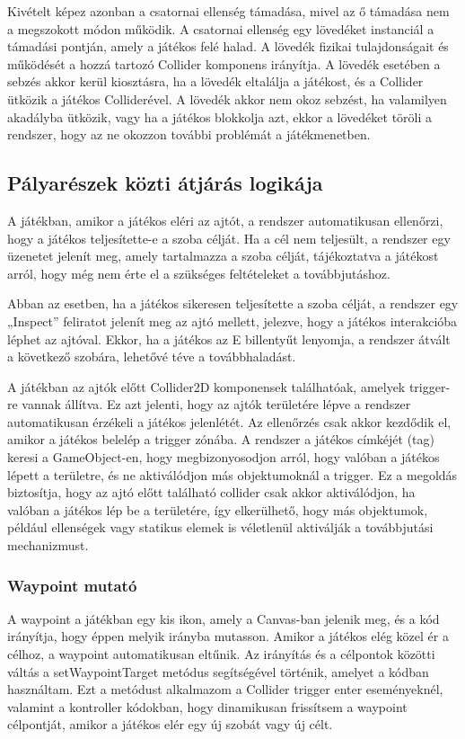 \documentclass[
]{thesis-ekf}
\theoremstyle{definition}
\theoremstyle{remark}
\begin{document}
Kivételt képez azonban a csatornai ellenség támadása, mivel az ő támadása nem a megszokott módon működik. A csatornai ellenség egy lövedéket instanciál a támadási pontján, amely a játékos felé halad. A lövedék fizikai tulajdonságait és működését a hozzá tartozó Collider komponens irányítja. A lövedék esetében a sebzés akkor kerül kiosztásra, ha a lövedék eltalálja a játékost, és a Collider ütközik a játékos Colliderével. A lövedék akkor nem okoz sebzést, ha valamilyen akadályba ütközik, vagy ha a játékos blokkolja azt, ekkor a lövedéket töröli a rendszer, hogy az ne okozzon további problémát a játékmenetben.
\subsection{Pályarészek közti átjárás logikája}
A játékban, amikor a játékos eléri az ajtót, a rendszer automatikusan ellenőrzi, hogy a játékos teljesítette-e a szoba célját. Ha a cél nem teljesült, a rendszer egy üzenetet jelenít meg, amely tartalmazza a szoba célját, tájékoztatva a játékost arról, hogy még nem érte el a szükséges feltételeket a továbbjutáshoz.

Abban az esetben, ha a játékos sikeresen teljesítette a szoba célját, a rendszer egy „Inspect” feliratot jelenít meg az ajtó mellett, jelezve, hogy a játékos interakcióba léphet az ajtóval. Ekkor, ha a játékos az E billentyűt lenyomja, a rendszer átvált a következő szobára, lehetővé téve a továbbhaladást.

A játékban az ajtók előtt Collider2D komponensek találhatóak, amelyek trigger-re vannak állítva. Ez azt jelenti, hogy az ajtók területére lépve a rendszer automatikusan érzékeli a játékos jelenlétét. Az ellenőrzés csak akkor kezdődik el, amikor a játékos belelép a trigger zónába. A rendszer a játékos címkéjét (tag) keresi a GameObject-en, hogy megbizonyosodjon arról, hogy valóban a játékos lépett a területre, és ne aktiválódjon más objektumoknál a trigger.
Ez a megoldás biztosítja, hogy az ajtó előtt található collider csak akkor aktiválódjon, ha valóban a játékos lép be a területére, így elkerülhető, hogy más objektumok, például ellenségek vagy statikus elemek is véletlenül aktiválják a továbbjutási mechanizmust.
\subsubsection{Waypoint mutató}
A waypoint a játékban egy kis ikon, amely a Canvas-ban jelenik meg, és a kód irányítja, hogy éppen melyik irányba mutasson. Amikor a játékos elég közel ér a célhoz, a waypoint automatikusan eltűnik. Az irányítás és a célpontok közötti váltás a setWaypointTarget metódus segítségével történik, amelyet a kódban használtam. Ezt a metódust alkalmazom a Collider trigger enter eseményeknél, valamint a kontroller kódokban, hogy dinamikusan frissítsem a waypoint célpontját, amikor a játékos elér egy új szobát vagy új célt.
\end{document}
